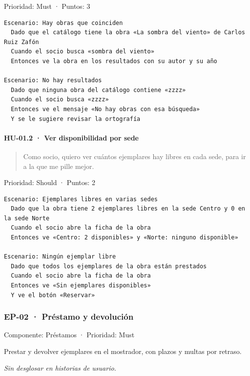 Prioridad: Must · Puntos: 3

\begin{Verbatim}[breaklines,fontsize=\small,frame=single,framerule=0.4pt,rulecolor=\color{black!25}]
Escenario: Hay obras que coinciden
  Dado que el catálogo tiene la obra «La sombra del viento» de Carlos Ruiz Zafón
  Cuando el socio busca «sombra del viento»
  Entonces ve la obra en los resultados con su autor y su año

Escenario: No hay resultados
  Dado que ninguna obra del catálogo contiene «zzzz»
  Cuando el socio busca «zzzz»
  Entonces ve el mensaje «No hay obras con esa búsqueda»
  Y se le sugiere revisar la ortografía
\end{Verbatim}

\paragraph*{HU-01.2 · Ver disponibilidad por sede}

\begin{quote}
Como socio, quiero ver cuántos ejemplares hay libres en cada sede, para ir a la que me pille mejor.
\end{quote}

Prioridad: Should · Puntos: 2

\begin{Verbatim}[breaklines,fontsize=\small,frame=single,framerule=0.4pt,rulecolor=\color{black!25}]
Escenario: Ejemplares libres en varias sedes
  Dado que la obra tiene 2 ejemplares libres en la sede Centro y 0 en la sede Norte
  Cuando el socio abre la ficha de la obra
  Entonces ve «Centro: 2 disponibles» y «Norte: ninguno disponible»

Escenario: Ningún ejemplar libre
  Dado que todos los ejemplares de la obra están prestados
  Cuando el socio abre la ficha de la obra
  Entonces ve «Sin ejemplares disponibles»
  Y ve el botón «Reservar»
\end{Verbatim}

\subsubsection*{EP-02 · Préstamo y devolución}

Componente: Préstamos · Prioridad: Must

Prestar y devolver ejemplares en el mostrador, con plazos y multas por retraso.

\emph{Sin desglosar en historias de usuario.}

